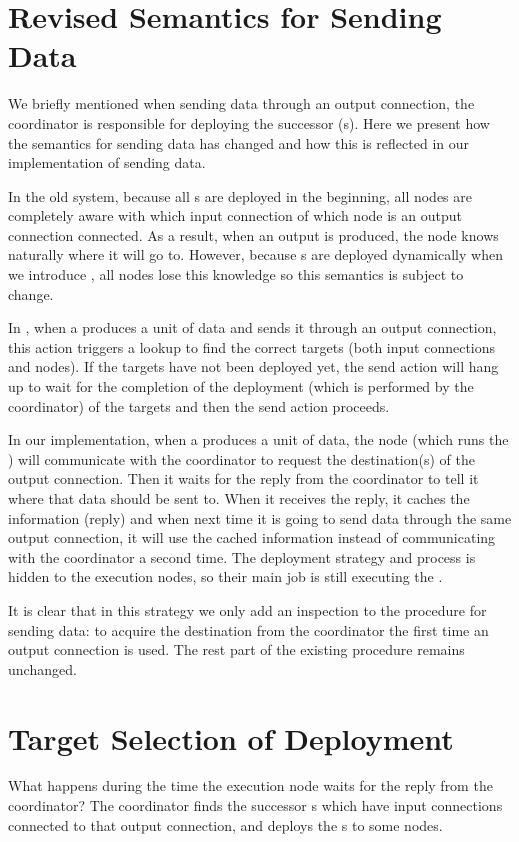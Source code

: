 \section{Revised Semantics for Sending Data}
We briefly mentioned when sending data through an output connection, the coordinator is responsible for deploying the successor \tPEInst{}(s). Here we present how the semantics for sending data has changed and how this is reflected in our implementation of sending data.

In the old \dpy system, because all \tPEInst{}s are deployed in the beginning, all nodes are completely aware with which input connection of which node is an output connection connected. As a result, when an output is produced, the node knows naturally where it will go to. However, because \tPEInst{}s are deployed dynamically when we introduce \tincdep, all nodes lose this knowledge so this semantics is subject to change.

In \tincdep, when a \tPEInst produces a unit of data and sends it through an output connection, this action triggers a lookup to find the correct targets (both input connections and nodes). If the targets have not been deployed yet, the send action will hang up to wait for the completion of the deployment (which is performed by the coordinator) of the targets and then the send action proceeds.

In our implementation, when a \tPEInst produces a unit of data, the node (which runs the \tPEInst) will communicate with the coordinator to request the destination(s) of the output connection. Then it waits for the reply from the coordinator to tell it where that data should be sent to. When it receives the reply, it caches the information (reply) and when next time it is going to send data through the same output connection, it will use the cached information instead of communicating with the coordinator a second time. 
The deployment strategy and process is hidden to the execution nodes, so their main job is still executing the \tPEInst.

It is clear that in this strategy we only add an inspection to the procedure for sending data: to acquire the destination from the coordinator the first time an output connection is used. The rest part of the existing procedure remains unchanged.

\section{Target Selection of Deployment}
What happens during the time the execution node waits for the reply from the coordinator? The coordinator finds the successor \tPEInst{}s which have input connections connected to that output connection, and deploys the \tPEInst{}s to some nodes.

